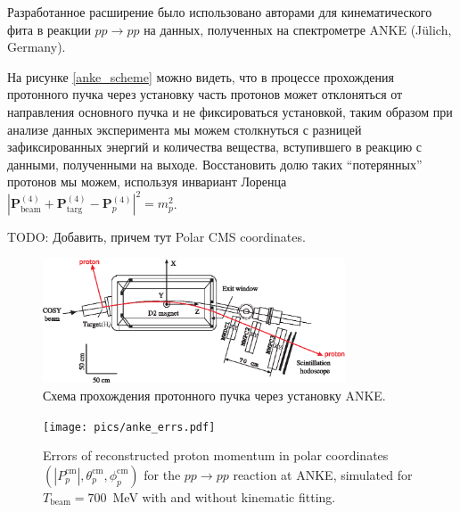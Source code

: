 Разработанное расширение было использовано авторами для кинематического фита в реакции $pp \to pp$ на данных, полученных на спектрометре ANKE (Jülich, Germany)\cite{anke}.

На рисунке \eqref{anke_scheme} можно видеть, что в процессе прохождения протонного пучка через установку часть протонов может отклоняться от направления основного пучка и не фиксироваться установкой, таким образом при анализе данных эксперимента мы можем столкнуться с разницей зафиксированных энергий и количества вещества, вступившего в реакцию с данными, полученными на выходе. Восстановить долю таких ``потерянных'' протонов мы можем, используя инвариант Лоренца $\left|\boldsymbol{P}^{(4)}_\mathrm{beam}+\boldsymbol{P}^{(4)}_\mathrm{targ}-\boldsymbol{P}^{(4)}_p\right|^2 = m_p^2$.

TODO: Добавить, причем тут Polar CMS coordinates.

\begin{figure}[h]
\centering
\centering\includegraphics[width=0.8\textwidth]{pics/setup_.eps}
\caption{
Схема прохождения протонного пучка через установку ANKE.
}
\label{anke_scheme}
\end{figure}



\begin{figure}[h]
\centering
\centering\texttt{[image: pics/anke\_errs.pdf]}
\caption{
Errors of reconstructed proton momentum in polar coordinates $(|P_p^\mathrm{cm}|, \theta_p^\mathrm{cm}, \phi_p^\mathrm{cm})$ for the $pp \to pp$ reaction at ANKE, simulated for $T_\mathrm{beam} = 700$~MeV with and without kinematic fitting.
}
\label{anke_scheme}
\end{figure}

